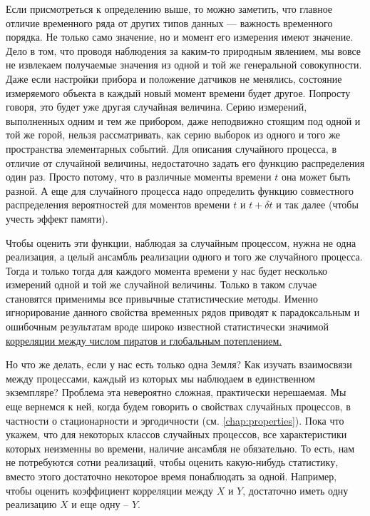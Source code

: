 Если присмотреться к определению выше, то можно заметить,
что главное отличие временного ряда от
других типов данных — важность
временного порядка. Не только само значение, но и момент его
измерения имеют значение. Дело в том, что проводя наблюдения за
каким-то природным явлением, мы вовсе не
извлекаем получаемые значения из одной и той же генеральной
совокупности. Даже если
настройки прибора и положение датчиков не менялись, состояние
измеряемого объекта в каждый новый момент времени будет другое.
Попросту говоря, это будет уже другая случайная величина. Серию
измерений, выполненных одним и тем же прибором, даже неподвижно
стоящим под одной и той же горой, нельзя рассматривать, как серию
выборок из одного и того же пространства элементарных событий. Для
описания случайного процесса, в отличие от случайной величины,
недостаточно задать его функцию
распределения один раз. Просто потому, что в различные моменты времени
$t$ она может быть разной. А еще для случайного процесса надо
определить функцию совместного распределения вероятностей для
моментов времени $t$ и $t+\delta t$ и так далее (чтобы учесть эффект памяти).

Чтобы оценить эти функции, наблюдая за случайным процессом, нужна не
одна реализация, а целый
ансамбль реализации одного и того же случайного процесса. Тогда
и только тогда для каждого момента времени у нас будет несколько
измерений одной и той же случайной величины. Только в таком случае
становятся применимы все привычные статистические методы. Именно
игнорирование данного свойства временных рядов приводят к
парадоксальным и ошибочным результатам вроде широко известной
статистически значимой
\href{https://www.ntu.ac.uk/__data/assets/pdf_file/0038/676946/Fairhurst.pdf}{корреляции
между числом пиратов и глобальным потеплением.}


Но что же делать, если у нас есть только одна Земля? Как изучать
взаимосвязи между процессами, каждый из которых мы наблюдаем в
единственном экземпляре? Проблема эта невероятно сложная,
практически нерешаемая. Мы еще вернемся к ней, когда будем говорить
о свойствах случайных процессов, в частности о стационарности и
эргодичности (см. \autoref{chap:properties}).
Пока что укажем, что для некоторых классов случайных
процессов, все характеристики которых неизменны во времени, наличие
ансамбля не обязательно. То есть, нам не потребуются сотни
реализаций, чтобы оценить какую-нибудь статистику, вместо этого
достаточно некоторое время понаблюдать за одной. Например, чтобы
оценить коэффициент корреляции между $X$ и $Y$, достаточно иметь одну
реализацию $X$ и еще одну – $Y$.


